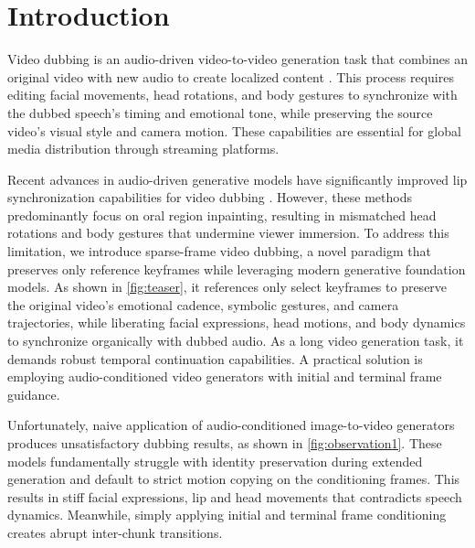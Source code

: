 \section{Introduction}

Video dubbing is an audio-driven video-to-video generation task that combines an original video with new audio to create localized content \cite{li2024latentsync, musetalk, keysync}. This process requires editing facial movements, head rotations, and body gestures to synchronize with the dubbed speech's timing and emotional tone, while preserving the source video's visual style and camera motion. These capabilities are essential for global media distribution through streaming platforms.

Recent advances in audio-driven generative models have significantly improved lip synchronization capabilities for video dubbing \cite{li2024latentsync}. However, these methods predominantly focus on oral region inpainting, resulting in mismatched head rotations and body gestures that undermine viewer immersion. To address this limitation, we introduce sparse-frame video dubbing, a novel paradigm that preserves only reference keyframes while leveraging modern generative foundation models. As shown in \cref{fig:teaser}, it references only select keyframes to preserve the original video's emotional cadence, symbolic gestures, and camera trajectories, while liberating facial expressions, head motions, and body dynamics to synchronize organically with dubbed audio. As a long video generation task, it demands robust temporal continuation capabilities. A practical solution is employing audio-conditioned video generators with initial and terminal frame guidance.

Unfortunately, naive application of audio-conditioned image-to-video generators produces unsatisfactory dubbing results, as shown in \cref{fig:observation1}. These models fundamentally struggle with identity preservation during extended generation and default to strict motion copying on the conditioning frames. This results in stiff facial expressions, lip and head movements that contradicts speech dynamics. Meanwhile, simply applying initial and terminal frame conditioning creates abrupt inter-chunk transitions. 



